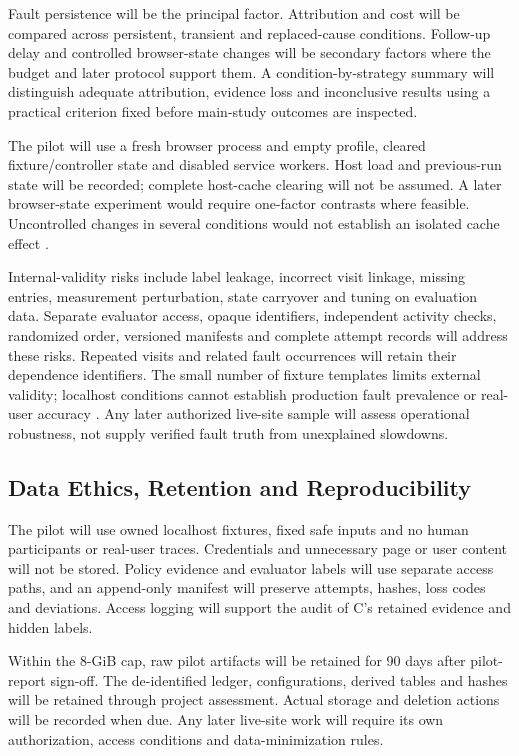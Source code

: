 Fault persistence will be the principal factor. Attribution and cost will be compared across persistent, transient and replaced-cause conditions. Follow-up delay and controlled browser-state changes will be secondary factors where the budget and later protocol support them. A condition-by-strategy summary will distinguish adequate attribution, evidence loss and inconclusive results using a practical criterion fixed before main-study outcomes are inspected.

The pilot will use a fresh browser process and empty profile, cleared fixture/controller state and disabled service workers. Host load and previous-run state will be recorded; complete host-cache clearing will not be assumed. A later browser-state experiment would require one-factor contrasts where feasible. Uncontrolled changes in several conditions would not establish an isolated cache effect \parencite{HS3PKWFL,ISZ9TU75,SSS4NSXC,U2NAEPYI}.

Internal-validity risks include label leakage, incorrect visit linkage, missing entries, measurement perturbation, state carryover and tuning on evaluation data. Separate evaluator access, opaque identifiers, independent activity checks, randomized order, versioned manifests and complete attempt records will address these risks. Repeated visits and related fault occurrences will retain their dependence identifiers. The small number of fixture templates limits external validity; localhost conditions cannot establish production fault prevalence or real-user accuracy \parencite{P57ARGS6,RB93JMBB,B9FIJAKE}. Any later authorized live-site sample will assess operational robustness, not supply verified fault truth from unexplained slowdowns.

\subsection{Data Ethics, Retention and Reproducibility}

The pilot will use owned localhost fixtures, fixed safe inputs and no human participants or real-user traces. Credentials and unnecessary page or user content will not be stored. Policy evidence and evaluator labels will use separate access paths, and an append-only manifest will preserve attempts, hashes, loss codes and deviations. Access logging will support the audit of C's retained evidence and hidden labels.

Within the 8-GiB cap, raw pilot artifacts will be retained for 90 days after pilot-report sign-off. The de-identified ledger, configurations, derived tables and hashes will be retained through project assessment. Actual storage and deletion actions will be recorded when due. Any later live-site work will require its own authorization, access conditions and data-minimization rules.

